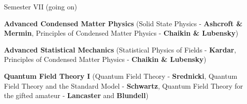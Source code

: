 \begin{cventries}
\cventry
{Semester VII (going on)} %
{} %
{} %
{} %
{
	\begin{cvitems} %
		\item {\textbf{Advanced Condensed Matter Physics} (Solid State Physics - \textbf{Ashcroft \& Mermin}, Principles of Condensed Matter Physics - \textbf{Chaikin \& Lubensky})}
		\item {\textbf{Advanced Statistical Mechanics} (Statistical Physics of Fields - \textbf{Kardar}, Principles of Condensed Matter Physics - \textbf{Chaikin \& Lubensky})}
		\item {\textbf{Quantum Field Theory I} (Quantum Field Theory - \textbf{Srednicki}, Quantum Field Theory and the Standard Model - \textbf{Schwartz}, Quantum Field Theory for the gifted amateur - \textbf{Lancaster} and \textbf{Blundell})}
	\end{cvitems}
}
\end{cventries}
